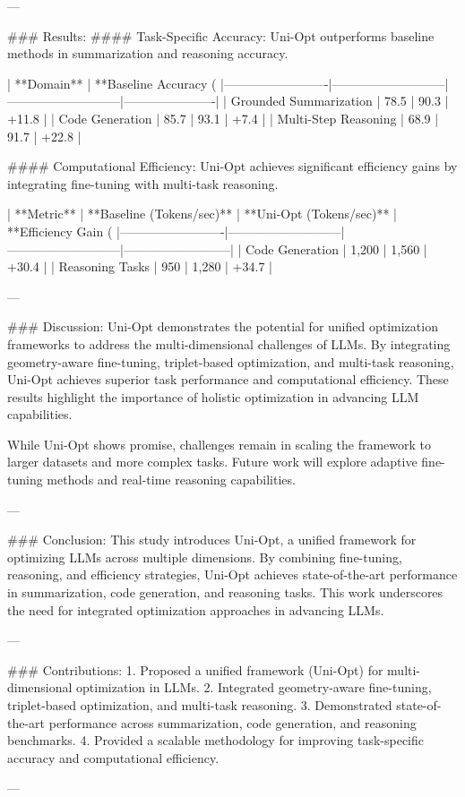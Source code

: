 ---

### Results:  
#### Task-Specific Accuracy:  
Uni-Opt outperforms baseline methods in summarization and reasoning accuracy.  

| **Domain**             | **Baseline Accuracy (%
|-------------------------|---------------------------|---------------------------|----------------------|
| Grounded Summarization  | 78.5                     | 90.3                     | +11.8               |
| Code Generation         | 85.7                     | 93.1                     | +7.4                |
| Multi-Step Reasoning    | 68.9                     | 91.7                     | +22.8               |

#### Computational Efficiency:  
Uni-Opt achieves significant efficiency gains by integrating fine-tuning with multi-task reasoning.  

| **Metric**              | **Baseline (Tokens/sec)** | **Uni-Opt (Tokens/sec)** | **Efficiency Gain (%
|-------------------------|---------------------------|---------------------------|--------------------------|
| Code Generation         | 1,200                    | 1,560                    | +30.4                   |
| Reasoning Tasks         | 950                      | 1,280                    | +34.7                   |

---

### Discussion:  
Uni-Opt demonstrates the potential for unified optimization frameworks to address the multi-dimensional challenges of LLMs. By integrating geometry-aware fine-tuning, triplet-based optimization, and multi-task reasoning, Uni-Opt achieves superior task performance and computational efficiency. These results highlight the importance of holistic optimization in advancing LLM capabilities.

While Uni-Opt shows promise, challenges remain in scaling the framework to larger datasets and more complex tasks. Future work will explore adaptive fine-tuning methods and real-time reasoning capabilities.

---

### Conclusion:  
This study introduces Uni-Opt, a unified framework for optimizing LLMs across multiple dimensions. By combining fine-tuning, reasoning, and efficiency strategies, Uni-Opt achieves state-of-the-art performance in summarization, code generation, and reasoning tasks. This work underscores the need for integrated optimization approaches in advancing LLMs.

---

### Contributions:  
1. Proposed a unified framework (Uni-Opt) for multi-dimensional optimization in LLMs.  
2. Integrated geometry-aware fine-tuning, triplet-based optimization, and multi-task reasoning.  
3. Demonstrated state-of-the-art performance across summarization, code generation, and reasoning benchmarks.  
4. Provided a scalable methodology for improving task-specific accuracy and computational efficiency.  

--- 


